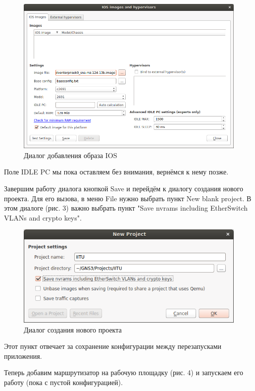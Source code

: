 \begin{figure}[h!]
\centering
\includegraphics[scale=0.55]{res/pic002}
\caption{Диалог добавления образа IOS}
\end{figure}

Поле IDLE PC мы пока оставляем без внимания, вернёмся к нему позже.

Завершим работу диалога кнопкой Save и перейдём к диалогу создания нового проекта. Для его вызова, в меню File нужно выбрать пункт New blank project. В этом диалоге (рис. 3) важно выбрать пункт "Save nvrams including EtherSwitch VLANs and crypto keys".

\begin{figure}[h!]
\centering
\includegraphics[scale=0.8]{res/pic003}
\caption{Диалог создания нового проекта}
\end{figure}

Этот пункт отвечает за сохранение конфигурации между перезапусками приложения.

Теперь добавим маршрутизатор на рабочую площадку (рис. 4) и запускаем его работу (пока с пустой конфигурацией).

